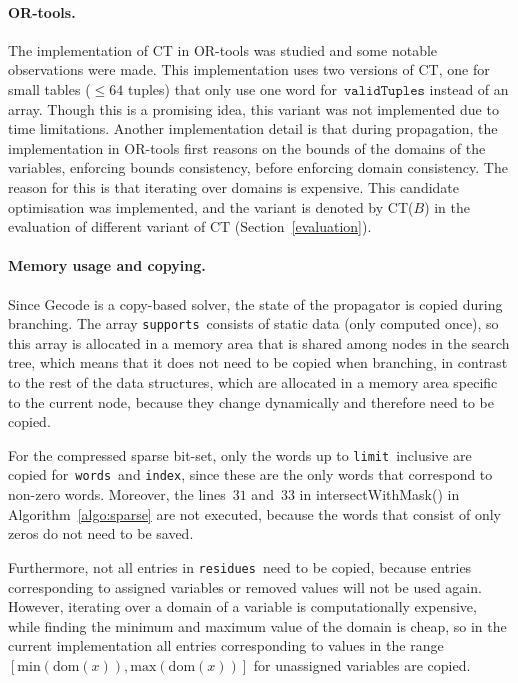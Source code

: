 \documentclass[a4paper,11pt]{article}
\theoremstyle{definition}
\newcommand{\Secref}[1]{Section~\ref{#1}}
\newcommand{\Algoref}[1]{Algorithm~\ref{#1}}
\newcommand{\Dom}[1]{\text{dom}({#1})}
\newcommand{\Words}{\texttt{words}}
\newcommand{\Index}{\texttt{index}}
\newcommand{\Limit}{\texttt{limit}}
\newcommand{\bitset}[0]{compressed sparse bit-set}
\newcommand{\CurrTable}{\texttt{validTuples}}
\newcommand{\Supports}{\texttt{supports}}
\newcommand{\Residues}{\texttt{residues}}
\numberwithin{equation}{section}
\begin{document}
\paragraph{OR-tools.} The implementation of CT in OR-tools was studied and
some notable observations were made.
This implementation uses two versions of CT, one for small tables
($\leq 64$ tuples) that only use one word for~$\CurrTable$ instead of an array.
Though this is a
promising idea, this variant was not implemented due to time limitations.
Another implementation detail is that during propagation, the implementation
in OR-tools first reasons on the bounds of the domains of the variables,
enforcing bounds consistency,
before enforcing domain consistency. The reason for this is that
iterating over domains is
expensive. This candidate optimisation was implemented,
and the variant is denoted by CT($B$) in the
evaluation of different variant of CT (\Secref{evaluation}).

\begin{sloppypar}
\paragraph{Memory usage and copying.}
Since Gecode is a copy-based solver, the state of the propagator is copied
during branching.
The array \Supports~consists of static data (only
computed once), so this array is allocated in a memory area that is shared
among nodes in the search tree, which means that it does not need to be
copied when branching, in contrast to the rest of the data structures,
which are allocated in a memory area specific to the current node,
because they change dynamically and therefore need to be copied.

For the \bitset, only the words up to \Limit~inclusive are copied for~\Words~and
\Index, since these are the only words that correspond to non-zero words.
Moreover, the lines~$31$ and~$33$ in intersectWithMask() in
\Algoref{algo:sparse} are not executed, because the words that consist
of only zeros do not need to be saved.

Furthermore, not all entries in \Residues~need to be copied, because entries
corresponding to assigned variables or removed values will not be used
again. However, iterating over a domain of a variable is computationally
expensive, while finding the minimum and maximum value of the domain is cheap, so
in the current implementation all entries corresponding to
values in the range~$[\text{min}(\Dom{x}),\text{max}(\Dom{x})]$ for unassigned
variables are copied.
\end{sloppypar}
\end{document}
